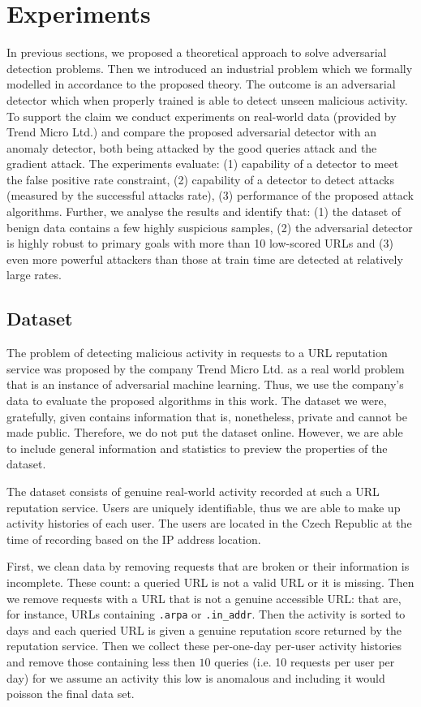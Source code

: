 \section{Experiments}\label{sec:experiments}
In previous sections, we proposed a theoretical approach to solve adversarial detection problems. Then we introduced an industrial problem which we formally modelled in accordance to the proposed theory. The outcome is an adversarial detector which when properly trained is able to detect unseen malicious activity. To support the claim we conduct experiments on real-world data (provided by Trend Micro Ltd.) and compare the proposed adversarial detector with an anomaly detector, both being attacked by the good queries attack and the gradient attack. The experiments evaluate: (1) capability of a detector to meet the false positive rate constraint, (2) capability of a detector to detect attacks (measured by the successful attacks rate), (3) performance of the proposed attack algorithms. Further, we analyse the results and identify that: (1) the dataset of benign data contains a few highly suspicious samples, (2) the adversarial detector is highly robust to primary goals with more than 10 low-scored URLs and (3) even more powerful attackers than those at train time are detected at relatively large rates.

\subsection{Dataset}
The problem of detecting malicious activity in requests to a URL reputation service was proposed by the company Trend Micro Ltd. as a real world problem that is an instance of adversarial machine learning. Thus, we use the company's data to evaluate the proposed algorithms in this work. The dataset we were, gratefully, given contains information that is, nonetheless, private and cannot be made public. Therefore, we do not put the dataset online. However, we are able to include general information and statistics to preview the properties of the dataset.

The dataset consists of genuine real-world activity recorded at such a URL reputation service. Users are uniquely identifiable, thus we are able to make up activity histories of each user. The users are located in the Czech Republic at the time of recording based on the IP address location.

First, we clean data by removing requests that are broken or their information is incomplete. These count: a queried URL is not a valid URL or it is missing. Then we remove requests with a URL that is not a genuine accessible URL: that are, for instance, URLs containing \texttt{.arpa} or \texttt{.in\_addr}. Then the activity is sorted to days and each queried URL is given a genuine reputation score returned by the reputation service. Then we collect these per-one-day per-user activity histories and remove those containing less then $10$ queries (i.e. 10 requests per user per day) for we assume an  activity this low is anomalous and including it would poisson the final data set.

